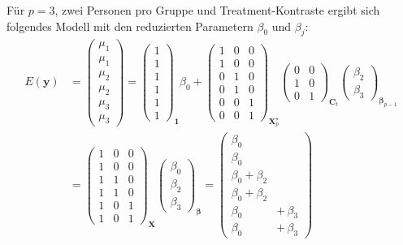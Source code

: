 Für $p=3$, zwei Personen pro Gruppe und Treatment-Kontraste ergibt sich folgendes Modell mit den reduzierten Parametern $\beta_{0}$ und $\beta_{j}$:
\begin{align*}
E(\bm{y}) &= \left(\begin{array}{c} \mu_{1}\\ \mu_{1}\\\hline \mu_{2}\\ \mu_{2}\\\hline \mu_{3}\\ \mu_{3}\end{array}\right)
 = \left(\begin{array}{c} 1\\ 1\\\hline 1\\ 1\\\hline 1\\ 1\end{array}\right)_{\bm{1}} \beta_{0} +
 \left(\begin{array}{ccc}
 1 & 0 & 0\\
 1 & 0 & 0\\\hline
 0 & 1 & 0\\
 0 & 1 & 0\\\hline
 0 & 0 & 1\\
 0 & 0 & 1
 \end{array}\right)_{\bm{X}_{p}^{\star}}
 \left(\begin{array}{rr}0 & 0 \\ 1 & 0 \\ 0 & 1 \end{array}\right)_{\bm{C}_{t}}
 \left(\begin{array}{c} \beta_{2}\\ \beta_{3}\end{array}\right)_{\bm{\beta}_{p-1}} \\ &= \left(\begin{array}{crr}1 & 0 & 0\\ 1 & 0 & 0\\\hline 1 & 1 & 0\\ 1 & 1 & 0\\\hline 1 & 0 & 1\\ 1 & 0 & 1\end{array}\right)_{\bm{X}}
 \left(\begin{array}{c} \beta_{0}\\ \beta_{2}\\ \beta_{3}\end{array}\right)_{\bm{\beta}} =
 \left(\begin{array}{ll}
 \beta_{0}             &               \\
 \beta_{0}             &               \\\hline
 \beta_{0} + \beta_{2} &               \\
 \beta_{0} + \beta_{2} &               \\\hline
 \beta_{0}             & + \, \beta_{3}\\
 \beta_{0}             & + \, \beta_{3}
 \end{array}\right)
\end{align*}

